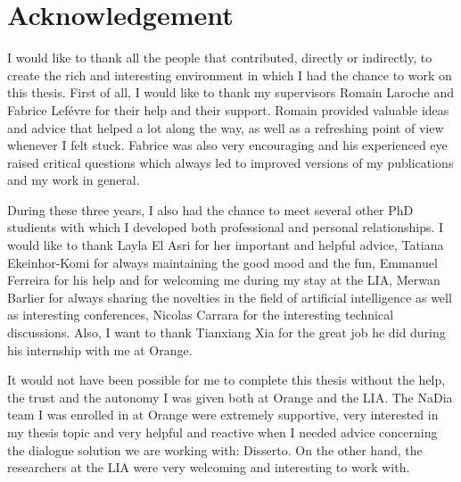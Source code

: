 \chapter*{Acknowledgement}

        I would like to thank all the people that contributed, directly or indirectly, to create the rich and interesting environment in which I had the chance to work on this thesis. First of all, I would like to thank my supervisors Romain Laroche and Fabrice Lef\'evre for their help and their support. Romain provided valuable ideas and advice that helped a lot along the way, as well as a refreshing point of view whenever I felt stuck. Fabrice was also very encouraging and his experienced eye raised critical questions which always led to improved versions of my publications and my work in general.

        During these three years, I also had the chance to meet several other PhD studients with which I developed both professional and personal relationships. I would like to thank Layla El Asri for her important and helpful advice, Tatiana Ekeinhor-Komi for always maintaining the good mood and the fun, Emmanuel Ferreira for his help and for welcoming me during my stay at the LIA, Merwan Barlier for always sharing the novelties in the field of artificial intelligence as well as interesting conferences, Nicolas Carrara for the interesting technical discussions. Also, I want to thank Tianxiang Xia for the great job he did during his internship with me at Orange.

        It would not have been possible for me to complete this thesis without the help, the trust and the autonomy I was given both at Orange and the LIA. The NaDia team I was enrolled in at Orange were extremely supportive, very interested in my thesis topic and very helpful and reactive when I needed advice concerning the dialogue solution we are working with: Disserto. On the other hand, the researchers at the LIA were very welcoming and interesting to work with.

        
